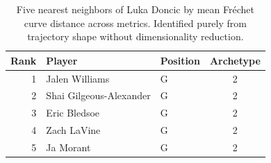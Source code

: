 \begin{table}[htbp]
  \centering\small
  \begin{tabular}{rllc}
    \toprule
    Rank & Player & Position & Archetype \\
    \midrule
    1 & Jalen Williams & G & 2 \\
    2 & Shai Gilgeous-Alexander & G & 2 \\
    3 & Eric Bledsoe & G & 2 \\
    4 & Zach LaVine & G & 2 \\
    5 & Ja Morant & G & 2 \\
    \bottomrule
  \end{tabular}
  \caption{Five nearest neighbors of Luka Doncic by mean Fr\'{e}chet curve distance across metrics. Identified purely from trajectory shape without dimensionality reduction.}
  \label{tab:Luka_Doncic_frechet_curve_neighbors}
\end{table}

